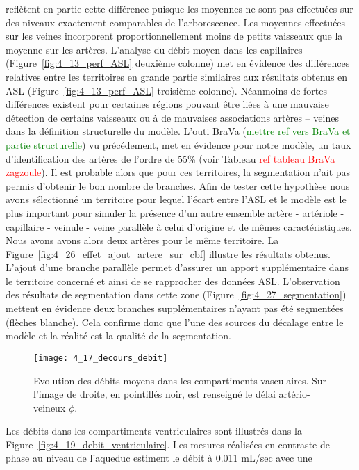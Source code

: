 reflètent en partie cette différence puisque les moyennes ne sont pas effectuées sur des niveaux
exactement comparables de l’arborescence. Les moyennes effectuées sur les veines incorporent
proportionnellement moins de petits vaisseaux que la moyenne sur les artères. L’analyse du débit
moyen dans les capillaires (Figure~\ref{fig:4_13_perf_ASL} deuxième colonne) met en évidence des différences relatives
entre les territoires en grande partie similaires aux résultats obtenus en ASL (Figure~\ref{fig:4_13_perf_ASL} troisième
colonne). Néanmoins de fortes différences existent pour certaines régions pouvant être liées à une mauvaise détection de certains vaisseaux ou à de
mauvaises associations artères – veines dans la définition structurelle du modèle. L'outi BraVa (\textcolor{green}{mettre ref vers BraVa et partie structurelle}) vu précédement, met en évidence pour notre modèle, un taux d'identification des artères de l'ordre de 55\% (voir Tableau \textcolor{red}{ref tableau BraVa zagzoule}). Il est probable alors que pour ces territoires, la segmentation n'ait pas permis d'obtenir le bon nombre de branches. Afin de tester cette hypothèse nous avons sélectionné un territoire pour lequel l'écart entre l'ASL et le modèle est le plus important pour simuler la présence d'un autre ensemble artère - artériole  - capillaire - veinule - veine parallèle à celui d'origine et de mêmes caractéristiques. Nous avons avons alors deux artères pour le même territoire. La Figure~\ref{fig:4_26_effet_ajout_artere_sur_cbf} illustre les résultats obtenus. L'ajout d'une branche parallèle permet d'assurer un apport supplémentaire dans le territoire concerné et ainsi de se rapprocher des données ASL. L'observation des résultats de segmentation dans cette zone (Figure~\ref{fig:4_27_segmentation}) mettent en évidence deux branches supplémentaires n'ayant pas été segmentées (flèches blanche). Cela confirme donc que l'une des sources du décalage entre le modèle et la réalité est la qualité de la segmentation.\\
\begin{figure}[!t]
\centering
\texttt{[image: 4\_17\_decours\_debit]}
\caption{Evolution des débits moyens dans les compartiments vasculaires. Sur l’image de droite, en pointillés noir, est
renseigné le délai artério-veineux $\phi$.}
\label{fig:4_17_decours_debit}	
\end{figure}
Les débits dans les compartiments ventriculaires sont illustrés dans la Figure~\ref{fig:4_19_debit_ventriculaire}. Les mesures
réalisées en contraste de phase au niveau de l’aqueduc estiment le débit à 0.011 mL/sec avec une
